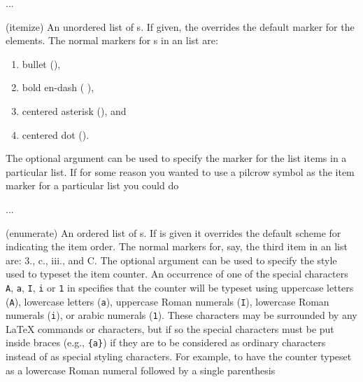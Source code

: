 \begin{syntax}
 \cmd{\item} ...  \\
\end{syntax}
\glossary(itemize)%
  {}%
  {An unordered list of s. If given, the  overrides the
   default marker for the elements.}
The normal markers for \cmd{\item}s in an  list are: 
\begin{enumerate}
\item bullet (\textbullet \cmd{\textbullet}), 
\item bold en-dash ({\normalfont\bfseries \textendash} \cmd{\bfseries}\cmd{\textendash}),
\item centered asterisk (\textasteriskcentered \cmd{\textasteriskcentered}), and
\item centered dot (\textperiodcentered \cmd{\textperiodcentered}).
\end{enumerate}
The optional  argument can be used to specify the marker for the
list items in a particular list. If for some reason you wanted to use a 
pilcrow symbol as the item marker for a particular list 
you could do



\begin{syntax}
 \cmd{\item} ...  \\
\end{syntax}
\glossary(enumerate)%
  {}%
  {An ordered list of s. If  is given it overrides the
   default scheme for indicating the item order.}
The normal markers for, say, the third item in an  list are: 
3., c., iii., and C. The optional  argument can be used to
specify the style used to typeset the item counter. An occurrence of
one of the special characters \texttt{A}, \texttt{a}, \texttt{I}, \texttt{i}
or \texttt{1} in  specifies that the counter will be typeset using
uppercase letters (\texttt{A}), lowercase letters (\texttt{a}), 
uppercase Roman numerals (\texttt{I}), lowercase Roman numerals (\texttt{i}), 
or arabic numerals (\texttt{1}). These characters
may be surrounded by any LaTeX commands or characters, but if so the special
characters must be put inside braces (e.g., \verb?{a}?) if they are to be 
considered as ordinary characters instead of as special styling characters.
 For example, to have the
counter typeset as a lowercase Roman numeral followed by a single parenthesis


